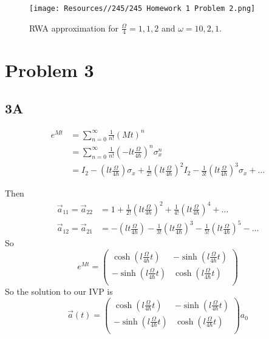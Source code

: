 \begin{figure}[h]
    \centering
    \texttt{[image: Resources//245/245 Homework 1 Problem 2.png]}
    \caption{RWA approximation for $\frac{\Omega}{4}=1,1,2$ and $\omega=10,2,1$.}
    \label{fig:rwa}
\end{figure}


\section*{Problem 3}

\subsection*{3A}

\begin{equation}
    \begin{split}
        e^{Mt} &= \sum_{n=0}^\infty \frac{1}{n!}(Mt)^n\\
        &=\sum_{n=0}^\infty\frac{1}{n!}(-lt\frac{\Omega}{4\hbar})^n\sigma_x^n\\
        &=I_2-(lt\frac{\Omega}{4\hbar})\sigma_x+\frac{1}{2!}(lt\frac{\Omega}{4\hbar})^2I_2-\frac{1}{3!}(lt\frac{\Omega}{4\hbar})^3\sigma_x+\dots
    \end{split}
\end{equation}

Then
\begin{equation}
    \begin{split}
        \vec{a}_{11} = \vec{a}_{22} &= 1+\frac{1}{2!}(lt\frac{\Omega}{4\hbar})^2+\frac{1}{4!}(lt\frac{\Omega}{4\hbar})^4 + \dots\\
        \vec{a}_{12} = \vec{a}_{21} &= -(lt\frac{\Omega}{4\hbar})-\frac{1}{3!}(lt\frac{\Omega}{4\hbar})^3-\frac{1}{5!}(lt\frac{\Omega}{4\hbar})^5-\dots
    \end{split}
\end{equation}
So
\begin{equation}
    e^{Mt} =
    \begin{pmatrix}
    \cosh(l\frac{\Omega}{4\hbar}t) & -\sinh(l\frac{\Omega}{4\hbar}t) \\
    -\sinh(l\frac{\Omega}{4\hbar}t) & \cosh(l\frac{\Omega}{4\hbar}t)\\
    \end{pmatrix}
\end{equation}
So the solution to our IVP is
\begin{equation}
    \vec{a}(t) =     \begin{pmatrix}
    \cosh(l\frac{\Omega}{4\hbar}t) & -\sinh(l\frac{\Omega}{4\hbar}t) \\
    -\sinh(l\frac{\Omega}{4\hbar}t) & \cosh(l\frac{\Omega}{4\hbar}t)\\
    \end{pmatrix} a_0
\end{equation}
\newpage

